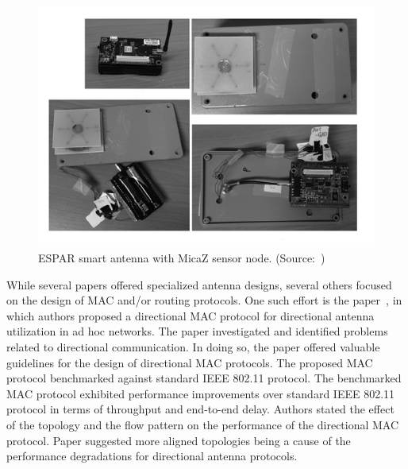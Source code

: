 \documentclass[12pt, oneandhalf, chaparabic, sees, ms]{metu}
\begin{document}
\vspace{2cm}

\begin{figure}[!htbp]
 \begin{center}
  \includegraphics[width=\textwidth]{loh2014.png}
 \end{center}
 \caption{ESPAR smart antenna with MicaZ sensor node. (Source:~\protect\cite{loh2014}) }
  \label{fig:loh2014}
\end{figure}
% 
%
%


While several papers offered specialized antenna designs, several others focused on the design of MAC and/or routing protocols.
One such effort is the paper~\cite{choudhury2006}, in which authors proposed a directional MAC protocol for directional antenna utilization in ad hoc networks.
The paper investigated and identified problems related to directional communication. In doing so, the paper offered valuable guidelines for the design of directional MAC protocols.
The proposed MAC protocol benchmarked against standard IEEE 802.11 protocol. The benchmarked MAC protocol
exhibited performance improvements over standard IEEE 802.11 protocol in terms of throughput and end-to-end delay. 
Authors stated the effect of the topology and the flow pattern on the performance of the 
directional MAC protocol. Paper suggested more aligned topologies being a cause of the performance degradations for directional antenna protocols. 
\end{document}
